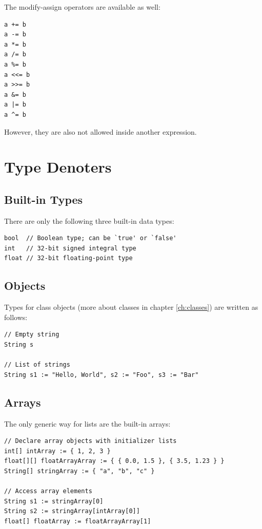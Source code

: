 \documentclass[a5paper]{report}
\begin{document}
The modify-assign operators are available as well:
\begin{lstlisting}
a += b
a -= b
a *= b
a /= b
a %= b
a <<= b
a >>= b
a &= b
a |= b
a ^= b
\end{lstlisting}
However, they are also not allowed inside another expression.



\section{Type Denoters}

\subsection{Built-in Types}

There are only the following three built-in data types:
\begin{lstlisting}
bool  // Boolean type; can be `true' or `false'
int   // 32-bit signed integral type
float // 32-bit floating-point type
\end{lstlisting}

\subsection{Objects}

Types for class objects (more about classes in chapter \ref{ch:classes}) are written as follows:
\begin{lstlisting}
// Empty string
String s

// List of strings
String s1 := "Hello, World", s2 := "Foo", s3 := "Bar"
\end{lstlisting}

\subsection{Arrays}

The only generic way for lists are the built-in arrays:
\begin{lstlisting}
// Declare array objects with initializer lists
int[] intArray := { 1, 2, 3 }
float[][] floatArrayArray := { { 0.0, 1.5 }, { 3.5, 1.23 } }
String[] stringArray := { "a", "b", "c" }

// Access array elements
String s1 := stringArray[0]
String s2 := stringArray[intArray[0]]
float[] floatArray := floatArrayArray[1]
\end{lstlisting}
\end{document}
